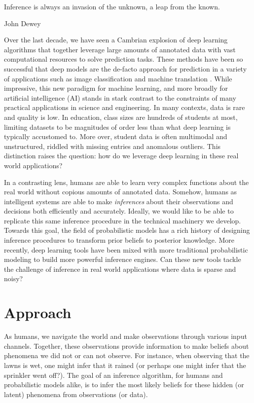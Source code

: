 \epigraph{Inference is always an invasion of the unknown, a leap from the known.}{John Dewey}

Over the last decade, we have seen a Cambrian explosion of deep learning algorithms that together leverage large amounts of annotated data with vast computational resources to solve prediction tasks. These methods have been so successful that deep models are the de-facto approach for prediction in a variety of applications such as image classification \cite{krizhevsky2012imagenet} and machine translation \cite{bahdanau2014neural}. While impressive, this new paradigm for machine learning, and more broadly for artificial intelligence (AI) stands in stark contrast to the constraints of many practical applications in science and engineering. In many contexts, data is rare and quality is low. In education, class sizes are hundreds of students at most, limiting datasets to be magnitudes of order less than what deep learning is typically accustomed to. More over, student data is often multimodal and unstructured, riddled with missing entries and anomalous outliers. This distinction raises the question: how do we leverage deep learning in these real world applications?

In a contrasting lens, humans are able to learn very complex functions about the real world without copious amounts of annotated data. Somehow, humans as intelligent systems are able to make \textit{inferences} about their observations and decisions both efficiently and accurately. Ideally, we would like to be able to replicate this same inference procedure in the technical machinery we develop. Towards this goal, the field of probabilistic models has a rich history of designing inference procedures to transform prior beliefs to posterior knowledge. More recently, deep learning tools have been mixed with more traditional probabilistic modeling to build more powerful inference engines. Can these new tools tackle the challenge of inference in real world applications where data is sparse and noisy? 

\section{Approach}

As humans, we navigate the world and make observations through various input channels. Together, these observations provide information to make beliefs about phenomena we did not or can not observe. For instance, when observing that the lawns is wet, one might infer that it rained (or perhaps one might infer that the sprinkler went off?). The goal of an inference algorithm, for humans and probabilistic models alike, is to infer the most likely beliefs for these hidden (or latent) phenomena from observations (or data). 

